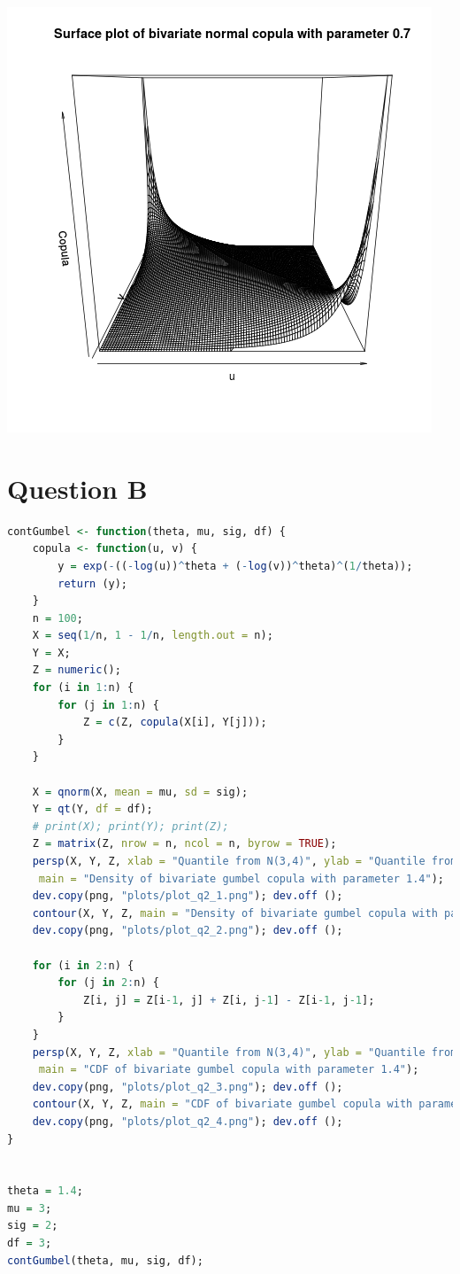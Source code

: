 \documentclass{article}
\begin{document}
\includegraphics{"plot_q1_2"}
\pagebreak


\section{Question B}


\begin{lstlisting}[language=R]
contGumbel <- function(theta, mu, sig, df) {
	copula <- function(u, v) {
		y = exp(-((-log(u))^theta + (-log(v))^theta)^(1/theta));
		return (y);
	}
	n = 100;
	X = seq(1/n, 1 - 1/n, length.out = n);
	Y = X;
	Z = numeric();
	for (i in 1:n) {
		for (j in 1:n) {
			Z = c(Z, copula(X[i], Y[j]));
		}
	}

	X = qnorm(X, mean = mu, sd = sig);
	Y = qt(Y, df = df);
	# print(X); print(Y); print(Z);
	Z = matrix(Z, nrow = n, ncol = n, byrow = TRUE);
	persp(X, Y, Z, xlab = "Quantile from N(3,4)", ylab = "Quantile from T(3)", zlab = "Density",
	 main = "Density of bivariate gumbel copula with parameter 1.4");
	dev.copy(png, "plots/plot_q2_1.png"); dev.off ();
	contour(X, Y, Z, main = "Density of bivariate gumbel copula with parameter 1.4");
	dev.copy(png, "plots/plot_q2_2.png"); dev.off ();

	for (i in 2:n) {
		for (j in 2:n) {
			Z[i, j] = Z[i-1, j] + Z[i, j-1] - Z[i-1, j-1];
		}
	}
	persp(X, Y, Z, xlab = "Quantile from N(3,4)", ylab = "Quantile from T(3)", zlab = "CDF",
	 main = "CDF of bivariate gumbel copula with parameter 1.4");
	dev.copy(png, "plots/plot_q2_3.png"); dev.off ();
	contour(X, Y, Z, main = "CDF of bivariate gumbel copula with parameter 1.4");
	dev.copy(png, "plots/plot_q2_4.png"); dev.off ();
}


theta = 1.4;
mu = 3;
sig = 2;
df = 3;
contGumbel(theta, mu, sig, df);
\end{lstlisting}
\end{document}
